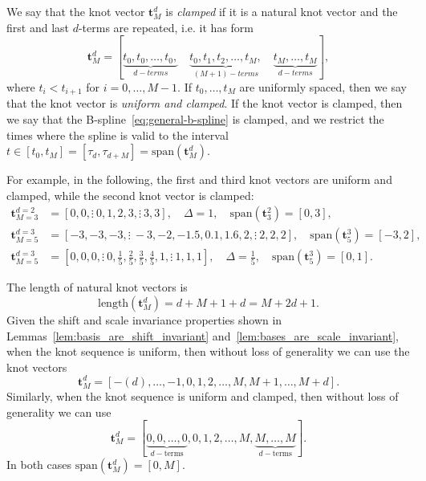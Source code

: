 \begin{definition}
We say that the knot vector $\mathbf{t}_M^d$ is {\em clamped} if it is a natural knot vector and the first and last $d$-terms are repeated, i.e. it has form
\[
\mathbf{t}_M^d = [\underbrace{t_0, t_0, \dots, t_0,}_{d-terms} \quad
			 \underbrace{t_0, t_1, t_2, \dots, t_M,}_{(M+1)-terms} \quad
			 \underbrace{t_M, \dots, t_M}_{d-terms}],	
\]
where $t_i<t_{i+1}$ for $i=0, \dots, M-1$. If $t_0, \dots, t_M$ are uniformly spaced, then we say that the knot vector is {\em uniform and clamped}.
If the knot vector is clamped, then we say that the B-spline~\eqref{eq:general-b-spline} is clamped, and we restrict the times where the spline is valid to the interval $t\in[t_0, t_M] = [\tau_d, \tau_{d+M}]=\text{span}(\mathbf{t}_M^d)$.  
\end{definition} 
For example, in the following, the first and third knot vectors are uniform and clamped, while the second knot vector is clamped:
\begin{align*}
	\mathbf{t}_{M=3}^{d=2} &= [0, 0, \vdots~ 0, 1, 2, 3, \vdots~ 3, 3], \quad
		\Delta=1, \quad \text{span}(\mathbf{t}_3^2)=[0, 3], \\
	\mathbf{t}_{M=5}^{d=3} &= [-3, -3, -3, \vdots~ -3, -2, -1.5, 0.1, 1.6, 2, \vdots~ 2, 2, 2], \quad
		\text{span}(\mathbf{t}_5^3)=[-3, 2], \\
	\mathbf{t}_{M=5}^{d=3} &= [0, 0, 0, \vdots~ 0, \frac{1}{5}, \frac{2}{5}, \frac{3}{5}, \frac{4}{5}, 1, \vdots~ 1, 1, 1], 
	\quad \Delta = \frac{1}{5}, \quad \text{span}(\mathbf{t}_5^3)=[0, 1].	
\end{align*}


The length of natural knot vectors is 
\[
\text{length}(\mathbf{t}_M^d) = d + M+1 + d = M+2d+1.
\]
Given the shift and scale invariance properties shown in Lemmas~\ref{lem:basis_are_shift_invariant} and~\ref{lem:bases_are_scale_invariant}, when the knot sequence is uniform, then without loss of generality we can use the knot vectors
\begin{equation}\label{eq:knot_vector_uniform}
	\mathbf{t}^d_M = [-(d), \dots, -1, 0, 1, 2, \dots, M, M+1, \dots, M+d].
\end{equation}
Similarly, when the knot sequence is uniform and clamped, then without loss of generality we can use
\begin{equation}\label{eq:knot_vector_uniform_clamped}
	\mathbf{t}^d_M = [\underbrace{0, 0, \dots, 0}_{d-\text{terms}}, 0, 1, 2, \dots, M, \underbrace{M, \dots, M}_{d-\text{terms}}].
\end{equation}
In both cases $\text{span}(\mathbf{t}_M^d)=[0,M]$.

